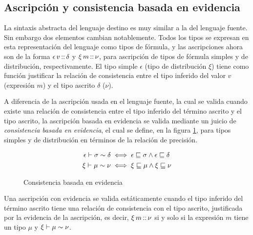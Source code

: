 \subsection{Ascripción y consistencia basada en evidencia}
\label{sec:lang-trgt-ascr}
La sintaxis abstracta del lenguaje destino es muy similar a la del lenguaje fuente.  Sin embargo dos elementos cambian notablemente. Todos los tipos se expresan en esta representación del lenguaje como tipos de fórmula, y las ascripciones ahora son de la forma $\epsilon\, v \mathop{\text{\sffamily ::}} \delta$ y $\xi\, m \mathop{\text{\sffamily ::}} \nu$, para ascripción de tipos de fórmula simples y de distribución, respectivamente. El tipo simple $\epsilon$ (tipo de distribución $\xi$) tiene como función justificar la relación de consistencia entre el tipo inferido del valor $v$ (expresión $m$) y el tipo ascrito $\delta$ ($\nu$).

A diferencia de la ascripción usada en el lenguaje fuente, la cual se valida cuando existe una relación de consistencia entre el tipo inferido del término ascrito y el tipo ascrito, la ascripción basada en evidencia se valida mediante un juicio de \emph{consistencia basada en evidencia}, el cual se define, en la figura \ref{fig:econsistency}, para tipos simples y de distribución en términos de la relación de precisión.
\begin{figure}[htbp]
\centering
\setlength{\belowdisplayskip}{2pt}
\setlength{\abovedisplayskip}{4pt}
\begin{align*}
\epsilon \vdash \sigma \sim \delta &\iff  \epsilon \sqsubseteq \sigma \land \epsilon \sqsubseteq \delta\\
\xi \vdash \mu \sim \nu &\iff  \xi \sqsubseteq \mu \land \xi \sqsubseteq \nu
\end{align*}
\captionsetup{skip=2pt}
\caption{Consistencia basada en evidencia}
\label{fig:econsistency}
\end{figure}

Una ascripción con evidencia se valida estáticamente cuando el tipo inferido del término ascrito tiene una relación de consistencia con el tipo ascrito, justificada por la evidencia de la ascripción, es decir,  $\xi\, m \mathop{\text{\sffamily ::}} \nu$ si y solo si la expresión $m$ tiene un tipo $\mu$ y $\xi \vdash \mu \sim \nu$.

